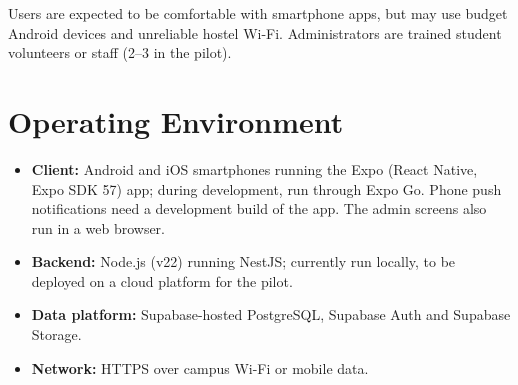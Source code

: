 \documentclass[11pt,a4paper]{scrreprt}
\begin{document}
Users are expected to be comfortable with smartphone apps, but may use
budget Android devices and unreliable hostel Wi-Fi. Administrators are
trained student volunteers or staff (2--3 in the pilot).

\section{Operating Environment}
\begin{itemize}
  \item \textbf{Client:} Android and iOS smartphones running the Expo
    (React Native, Expo SDK 57) app; during development, run through Expo Go.
    Phone push notifications need a development build of the app. The admin
    screens also run in a web browser.
  \item \textbf{Backend:} Node.js (v22) running NestJS; currently run
    locally, to be deployed on a cloud platform for the pilot.
  \item \textbf{Data platform:} Supabase-hosted PostgreSQL, Supabase Auth
    and Supabase Storage.
  \item \textbf{Network:} HTTPS over campus Wi-Fi or mobile data.
\end{itemize}
\end{document}
